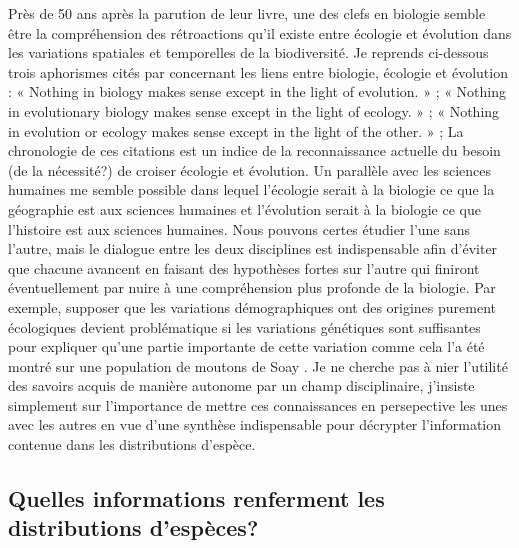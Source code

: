 Près de 50 ans après la parution de leur livre, une des clefs en
biologie semble être la compréhension des rétroactions qu'il existe
entre écologie et évolution dans les variations spatiales et temporelles
de la biodiversité. Je reprends ci-dessous trois aphorismes cités par
\citet{Schoener2011a} concernant les liens entre biologie, écologie et
évolution : « Nothing in biology makes sense except in the light of
evolution. » \citep{Dobzhansky1973}; « Nothing in evolutionary biology
makes sense except in the light of ecology. » \citep{grant2008}; «
Nothing in evolution or ecology makes sense except in the light of the
other. » \citep{Pelletier2009a}; La chronologie de ces citations est un
indice de la reconnaissance actuelle du besoin (de la nécessité?) de
croiser écologie et évolution. Un parallèle avec les sciences humaines
me semble possible dans lequel l'écologie serait à la biologie ce que la
géographie est aux sciences humaines et l'évolution serait à la biologie
ce que l'histoire est aux sciences humaines. Nous pouvons certes étudier
l'une sans l'autre, mais le dialogue entre les deux disciplines est
indispensable afin d'éviter que chacune avancent en faisant des
hypothèses fortes sur l'autre qui finiront éventuellement par nuire à
une compréhension plus profonde de la biologie. Par exemple, supposer
que les variations démographiques ont des origines purement écologiques
devient problématique si les variations génétiques sont suffisantes pour
expliquer qu'une partie importante de cette variation comme cela l'a été
montré sur une population de moutons de Soay \citep{Pelletier2007}. Je
ne cherche pas à nier l'utilité des savoirs acquis de manière autonome
par un champ disciplinaire, j'insiste simplement sur l'importance de
mettre ces connaissances en persepective les unes avec les autres en vue
d'une synthèse indispensable pour décrypter l'information contenue dans
les distributions d'espèce.

\subsection*{Quelles informations renferment les distributions
d'espèces?}\label{quelles-informations-renferment-les-distributions-despuxe8ces}

